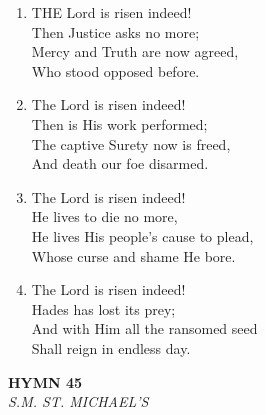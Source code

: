 \begin{enumerate}
    \item THE Lord is risen indeed! \\
        Then Justice asks no more; \\
        Mercy and Truth are now agreed, \\
        Who stood opposed before.

    \item The Lord is risen indeed! \\
        Then is His work performed; \\
        The captive Surety now is freed, \\
        And death our foe disarmed.

    \item The Lord is risen indeed! \\
        He lives to die no more, \\
        He lives His people's cause to plead, \\
        Whose curse and shame He bore.

    \item The Lord is risen indeed! \\
        Hades has lost its prey; \\
        And with Him all the ransomed seed \\
        Shall reign in endless day.

\end{enumerate}

\newpage
\begin{center}
    {\Large \textbf{HYMN 45}}
    \\
    \textit{S.M. ST. MICHAEL'S}
\end{center}
\vspace{1em}

